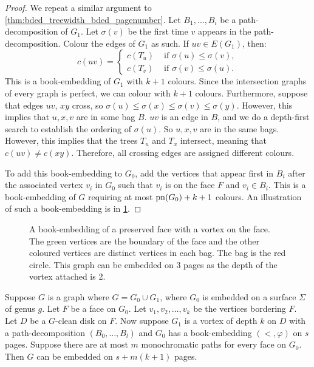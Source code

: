 \begin{proof}
	We repeat a similar argument to \cref{thm:bded_treewidth_bded_pagenumber}. Let \(B_1, \ldots, B_i\) be a path-decomposition of \(G_1\). Let \(\sigma(v)\) be the first time \(v\) appears in the path-decomposition. Colour the edges of \(G_1\) as such. If \(uv \in E(G_1)\), then:
	\begin{equation}
		c(uv) =
		\begin{cases}
			c(T_u) & \text{ if } \sigma(u) \leq \sigma(v), \\
			c(T_v) & \text{ if } \sigma(v) \leq \sigma(u).
		\end{cases}
	\end{equation}
	This is a book-embedding of \(G_1\) with \(k+1\) colours. Since the intersection graphs of every graph is perfect, we can colour with $k + 1$ colours. Furthermore, suppose that edges \(uv\), \(xy\) cross, so \(\sigma(u) \leq \sigma(x) \leq \sigma(v) \leq \sigma(y)\). However, this implies that $u,x,v$ are in some bag $B$. \(uv\) is an edge in \(B\), and we do a depth-first search to establish the ordering of $\sigma(u)$. So \(u, x, v\) are in the same bags. However, this implies that the trees \(T_u\) and \(T_x\) intersect, meaning that \(c(uv) \neq c(xy)\). Therefore, all crossing edges are assigned different colours. 

	To add this book-embedding to \(G_0\), add the vertices that appear first in \(B_i\) after the associated vertex \(v_i\) in \(G_0\) such that \(v_i\) is on the face \(F\) and \(v_i \in B_i\). This is a book-embedding of \(G\) requiring at most \(\operatorname{pn}(G_0) + k + 1\) colours. An illustration of such a book-embedding is in \cref{fig:preserved_face}.
\end{proof}

\begin{figure}[h!]
	\centering
	
	\caption[Book-embedding of a preserved face]{A book-embedding of a preserved face  with a vortex on the face. The green vertices are the boundary of the face and the other coloured vertices are distinct vertices in each bag. The bag is the red circle. This graph can be embedded on $3$ pages as the depth of the vortex attached is 2. }\label{fig:preserved_face}
\end{figure}

\begin{lemma}\label{lem:vortices_mono_paths}
	Suppose \(G\) is a graph where $G = G_0 \cup G_1$, where \(G_0\) is embedded on a surface \(\Sigma \) of genus \(g\). Let \(F\) be a face on \(G_0\). Let \(v_1, v_2, \ldots, v_k\) be the vertices bordering \(F\). Let \(D\) be a \(G\)-clean disk on \(F\). Now suppose \(G_1\) is a vortex of depth $k$ on \(D\) with a path-decomposition \((B_0, \ldots, B_l)\) and \(G_0\) has a book-embedding \((<, \varphi)\) on $s$ pages. Suppose there are at most \(m\) monochromatic paths for every face on $G_0$. Then \(G\) can be embedded on \(s + m(k+1)\) pages.
\end{lemma}


